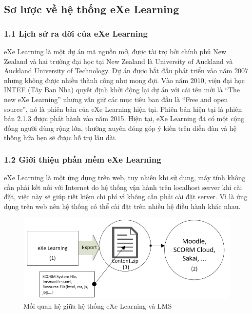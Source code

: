 \subsection{Sơ lược về hệ thống eXe Learning}
\subsubsection{1.1 Lịch sử ra đời của eXe Learning}
eXe Learning là một dự án mã nguồn mở, được tài trợ bởi chính phủ New Zealand và hai trường đại học tại New Zealand là University of Auckland và Auckland University of Technology. Dự án được bắt đầu phát triển vào năm 2007 nhưng không được nhiều thành công như mong đợi. Vào năm 2010, viện đại học INTEF (Tây Ban Nha) quyết định khởi động lại dự án với cái tên mới là “The new eXe Learning” nhưng vẫn giữ các mục tiêu ban đầu là “Free and open source”, nó là phiên bản của eXe Learning hiện tại. Phiên bản hiện tại là phiên bản 2.1.3 được phát hành vào năm 2015. Hiện tại, eXe Learning đã có một cộng đồng người dùng rộng lớn, thường xuyên đóng góp ý kiến trên diễn đàn và hệ thống hứa hẹn sẽ được hỗ trợ lâu dài.\\

\subsubsection{1.2 Giới thiệu phần mềm eXe Learning}
eXe Learning là một ứng dụng trên web, tuy nhiên khi sử dụng, máy tính không cần phải kết nối với Internet do hệ thống vận hành trên localhost server khi cài đặt, việc này sẽ giúp tiết kiệm chi phí vì không cần phải cài đặt server. Vì là ứng dụng trên web nên hệ thống có thể cài đặt trên nhiều hệ điều hành khác nhau.\\

\vspace{1cm}

\begin{center}
	\begin{figure}[htp]
		\begin{center}
			\includegraphics[width=16cm]{Chapter2/Pictures/picture27.png}
		\end{center}
		\caption{Mối quan hệ giữa hệ thống eXe Learning và LMS}
		\label{refpicture27}
	\end{figure}
\end{center}

